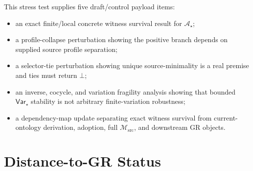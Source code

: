 \documentclass[11pt]{article}
\newcommand{\Msrc}{\mathcal{M}_{\mathrm{src}}}
\newcommand{\Bot}{\bot}
\newcommand{\Astar}{\mathcal A_{\star}}
\newcommand{\Varstar}{\mathsf{Var}_{\star}}
\begin{document}
This stress test supplies five draft/control payload items:
\begin{itemize}
  \item an exact finite/local concrete witness survival result for \(\Astar\);
  \item a profile-collapse perturbation showing the positive branch depends on
  supplied source profile separation;
  \item a selector-tie perturbation showing unique source-minimality is a real
  premise and ties must return \(\Bot\);
  \item an inverse, cocycle, and variation fragility analysis showing that
  bounded \(\Varstar\) stability is not arbitrary finite-variation robustness;
  \item a dependency-map update separating exact witness survival from
  current-ontology derivation, adoption, full \(\Msrc\), and downstream GR
  objects.
\end{itemize}

\section{Distance-to-GR Status}
\end{document}
